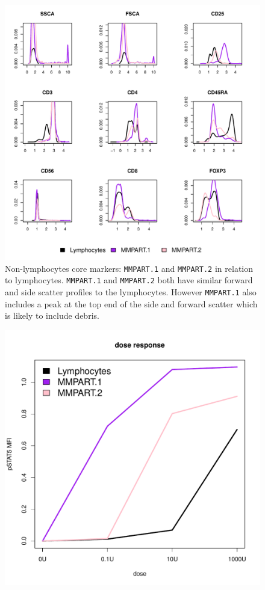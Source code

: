 %
\begin{figure}
\centering
\begin{minipage}{.9\textwidth}
\includegraphics[width=\linewidth]{figures/mmpart-nonlymphocytes-clusters}
{Non-lymphocytes core markers: \texttt{MMPART.1} and \texttt{MMPART.2} in relation to lymphocytes. }
{
\texttt{MMPART.1} and \texttt{MMPART.2} both have similar forward and side scatter profiles to the lymphocytes.
However \texttt{MMPART.1} also includes a peak at the top end of the side and forward scatter which is likely to include debris.
}
\end{minipage}
%
\begin{minipage}{.5\textwidth}
  \includegraphics[width=\linewidth]{figures/mmpart-nonlymphocytes-dose-response}

\end{minipage}
\end{figure}
